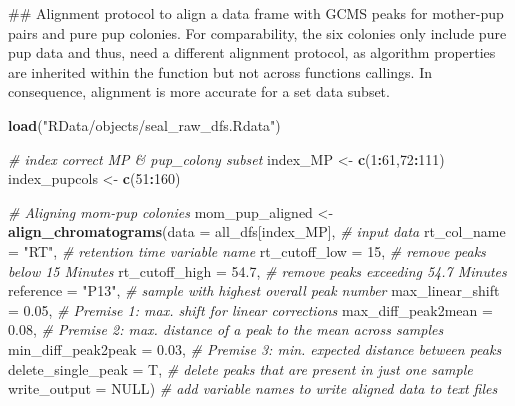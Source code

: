 \documentclass[]{article}
\newenvironment{Shaded}{\begin{snugshade}}{\end{snugshade}}
\newcommand{\KeywordTok}[1]{\textcolor[rgb]{0.13,0.29,0.53}{\textbf{#1}}}
\newcommand{\DataTypeTok}[1]{\textcolor[rgb]{0.13,0.29,0.53}{#1}}
\newcommand{\DecValTok}[1]{\textcolor[rgb]{0.00,0.00,0.81}{#1}}
\newcommand{\FloatTok}[1]{\textcolor[rgb]{0.00,0.00,0.81}{#1}}
\newcommand{\StringTok}[1]{\textcolor[rgb]{0.31,0.60,0.02}{#1}}
\newcommand{\CommentTok}[1]{\textcolor[rgb]{0.56,0.35,0.01}{\textit{#1}}}
\newcommand{\OtherTok}[1]{\textcolor[rgb]{0.56,0.35,0.01}{#1}}
\newcommand{\OperatorTok}[1]{\textcolor[rgb]{0.81,0.36,0.00}{\textbf{#1}}}
\newcommand{\NormalTok}[1]{#1}
\begin{document}
\begin{Shaded}
\begin{Highlighting}[]
\NormalTok{## Alignment protocol to align a data frame with GCMS peaks for mother-pup pairs and pure pup colonies. For comparability, the six colonies only include pure pup data and thus, need a different alignment protocol, as algorithm properties are inherited within the function but not across functions callings. In consequence, alignment is more accurate for a set data subset.}


\KeywordTok{load}\NormalTok{(}\StringTok{"RData/objects/seal_raw_dfs.Rdata"}\NormalTok{)}

\CommentTok{# index correct MP & pup_colony subset}
\NormalTok{index_MP <-}\StringTok{ }\KeywordTok{c}\NormalTok{(}\DecValTok{1}\OperatorTok{:}\DecValTok{61}\NormalTok{,}\DecValTok{72}\OperatorTok{:}\DecValTok{111}\NormalTok{)}
\NormalTok{index_pupcols <-}\StringTok{ }\KeywordTok{c}\NormalTok{(}\DecValTok{51}\OperatorTok{:}\DecValTok{160}\NormalTok{)}

\CommentTok{# Aligning mom-pup colonies}
\NormalTok{mom_pup_aligned <-}\StringTok{ }\KeywordTok{align_chromatograms}\NormalTok{(}\DataTypeTok{data =}\NormalTok{ all_dfs[index_MP], }\CommentTok{# input data}
                                         \DataTypeTok{rt_col_name =} \StringTok{"RT"}\NormalTok{, }\CommentTok{# retention time variable name }
                                         \DataTypeTok{rt_cutoff_low =} \DecValTok{15}\NormalTok{, }\CommentTok{# remove peaks below 15 Minutes}
                                         \DataTypeTok{rt_cutoff_high =} \FloatTok{54.7}\NormalTok{, }\CommentTok{# remove peaks exceeding 54.7 Minutes}
                                         \DataTypeTok{reference =} \StringTok{"P13"}\NormalTok{, }\CommentTok{# sample with highest overall peak number}
                                         \DataTypeTok{max_linear_shift =} \FloatTok{0.05}\NormalTok{, }\CommentTok{# Premise 1: max. shift for linear corrections}
                                         \DataTypeTok{max_diff_peak2mean =} \FloatTok{0.08}\NormalTok{, }\CommentTok{# Premise 2: max. distance of a peak to the mean across samples}
                                         \DataTypeTok{min_diff_peak2peak =} \FloatTok{0.03}\NormalTok{, }\CommentTok{# Premise 3: min. expected distance between peaks }
                                         \DataTypeTok{delete_single_peak =}\NormalTok{ T, }\CommentTok{# delete peaks that are present in just one sample }
                                         \DataTypeTok{write_output =} \OtherTok{NULL}\NormalTok{) }\CommentTok{# add variable names to write aligned data to text files}


\end{Highlighting}
\end{Shaded}
\end{document}
